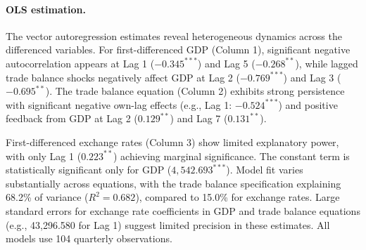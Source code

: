 \documentclass[
]{article}
\begin{document}
\paragraph*{OLS estimation.} 


The vector autoregression estimates reveal heterogeneous dynamics across the
differenced variables. For first-differenced GDP (Column 1), significant 
negative autocorrelation appears at Lag 1 ($-0.345^{***}$) and 
Lag 5 ($-0.268^{**}$), while lagged trade balance shocks negatively
affect GDP at Lag 2 ($-0.769^{***}$) and Lag 3 ($-0.695^{**}$). 
The trade balance equation (Column 2) exhibits strong persistence with 
significant negative own-lag effects (e.g., Lag 1: $-0.524^{***}$)
and positive feedback from GDP at Lag 2 ($0.129^{**}$) and Lag 7 ($0.131^{**}$). 

First-differenced exchange rates (Column 3) show limited explanatory power, 
with only Lag 1 ($0.223^{**}$) achieving marginal significance. 
The constant term is statistically significant only for GDP ($4,\!542.693^{***}$). 
Model fit varies substantially across equations, with the trade balance 
specification explaining 68.2\% of variance ($R^2 = 0.682$), compared to 
15.0\% for exchange rates. Large standard errors for exchange rate coefficients 
in GDP and trade balance equations (e.g., 43,296.580 for Lag 1) suggest
limited precision in these estimates. All models use 104 quarterly observations.
\end{document}
